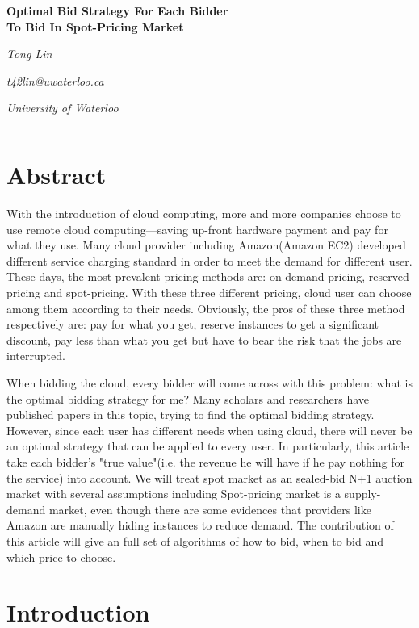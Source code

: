 \documentclass[11pt]{article}
\begin{document}
\begin{center}

{\large\bf Optimal Bid Strategy For Each Bidder\\ To Bid In Spot-Pricing Market}

\vspace{12pt}

{\em Tong Lin}

{\em t42lin@uwaterloo.ca}

{\em University of Waterloo}
\end{center}

$\ $

\section{Abstract}

With the introduction of cloud computing, more and more companies choose to use remote cloud computing---saving up-front hardware payment and pay for what they use. Many cloud provider including Amazon(Amazon EC2) developed different service charging standard in order to meet the demand for different user. These days, the most prevalent pricing methods are: on-demand pricing, reserved pricing and spot-pricing. With these three different pricing, cloud user can choose among them according to their needs. Obviously, the pros of these three method respectively are: pay for what you get, reserve instances to get a significant discount, pay less than what you get but have to bear the risk that the jobs are interrupted. 

When bidding the cloud, every bidder will come across with this problem: what is the optimal bidding strategy for me? Many scholars and researchers have published papers in this topic, trying to find the optimal bidding strategy. However, since each user has different needs when using cloud, there will never be an optimal strategy that can be applied to every user. In particularly, this article take each bidder's "true value"(i.e. the revenue he will have if he pay nothing for the service) into account. We will treat spot market as an sealed-bid N+1 auction market with several assumptions including Spot-pricing market is a supply-demand market, even though there are some evidences that providers like Amazon are manually hiding instances to reduce demand. The contribution of this article will give an full set of algorithms of how to bid, when to bid and which price to choose.


\section{Introduction}
\end{document}
